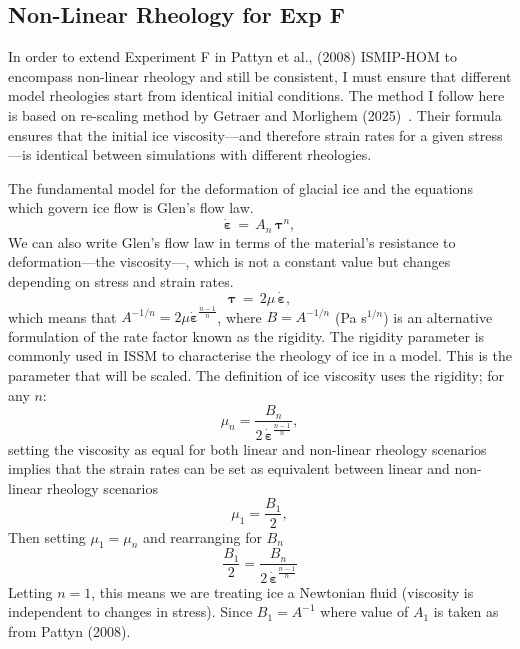 \subsection{Non-Linear Rheology for Exp F}
In order to extend Experiment F in Pattyn et al., (2008) ISMIP-HOM to encompass non-linear rheology and still be consistent, I must ensure that different model rheologies start from identical initial conditions. The method I follow here is based on re-scaling method by Getraer and Morlighem (2025)~\cite{Getraer_2025}. Their formula ensures that the initial ice viscosity—and therefore strain rates for a given stress—is identical between simulations with different rheologies.

The fundamental model for the deformation of glacial ice and the equations which govern ice flow is Glen's flow law. 
\begin{equation}
\mathbf{\dot{\varepsilon}} \,=\, A_{n}\,\mathbf{\tau}^{n},
\end{equation}
We can also write Glen's flow law in terms of the material's resistance to deformation—the viscosity—, which is not a constant value but changes depending on stress and strain rates.
\begin{equation}
\mathbf{\tau}\,=\, 2\mu\,\mathbf{\dot{\varepsilon}},
\end{equation}
which means that $A^{-1/n} = 2\mu \mathbf{\dot{\varepsilon}}^{\frac{n-1}{n}}$, where $B=A^{-1/n}$ (Pa s$^{1/n}$) is an alternative formulation of the rate factor known as the rigidity. The rigidity parameter is commonly used in ISSM to characterise the rheology of ice in a model. This is the parameter that will be scaled.
The definition of ice viscosity uses the rigidity; for any $n$:
\begin{equation}
\mu_n = \frac{B_n}{2\,\mathbf{\dot{\varepsilon}}^{\frac{n-1}{n}}},
\end{equation}
setting the viscosity as equal for both linear and non-linear rheology scenarios implies that the strain rates can be set as equivalent between linear and non-linear rheology scenarios
\begin{equation}
\mu_1 = \frac{B_1}{2},
\end{equation}
Then setting $\mu_1 = \mu_n$ and rearranging for $B_n$
\begin{equation}
\frac{B_1}{2} = \frac{B_n}{2\,\mathbf{\dot{\varepsilon}}^{\frac{n-1}{n}}}
\end{equation}
Letting $n = 1$, this means we are treating ice a Newtonian fluid (viscosity is independent to changes in stress). Since $B_{1}=A^{-1}$ where value of $A_{1}$ is taken as from Pattyn (2008). 
